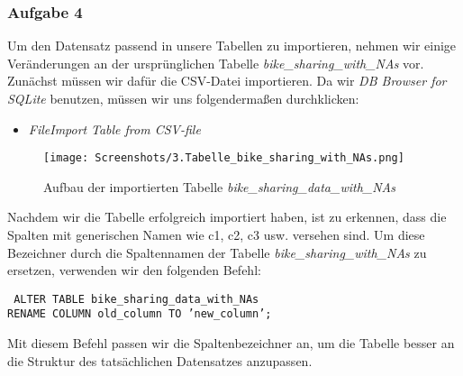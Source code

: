 \documentclass[a4paper, 12pt]{article}
\begin{document}
\newpage
\subsubsection{Aufgabe 4}
{\fontsize{12}{15}\selectfont
Um den Datensatz passend in unsere Tabellen zu importieren, nehmen wir einige Veränderungen an der ursprünglichen Tabelle \textit{bike\_sharing\_with\_NAs} vor. Zunächst müssen wir dafür die CSV-Datei importieren. Da wir \textit{DB Browser for SQLite} benutzen, müssen wir uns folgendermaßen durchklicken:

\vspace{\baselineskip} 

\begin{itemize}
    \item \textit{File}\rightarrow \textit{Import} \rightarrow \textit{Table from CSV-file}
\end{itemize} 

\vspace{\baselineskip} 

\begin{figure}[ht]
    \centering
      \texttt{[image: Screenshots/3.Tabelle\_bike\_sharing\_with\_NAs.png]}
        \par Aufbau der importierten Tabelle \textit{bike\_sharing\_data\_with\_NAs} 
\end{figure}


\vspace{\baselineskip} 

Nachdem wir die Tabelle erfolgreich importiert haben, ist zu erkennen, dass die Spalten mit generischen Namen wie c1, c2, c3 usw. versehen sind. Um diese Bezeichner durch die Spaltennamen der Tabelle \textit{bike\_sharing\_with\_NAs} zu ersetzen, verwenden wir den folgenden Befehl:

\vspace{\baselineskip}

{\fontsize{10}{12}\selectfont
\texttt{%
ALTER TABLE bike\_sharing\_data\_with\_NAs \\ RENAME COLUMN old\_column TO 'new\_column';} 
}

\vspace{\baselineskip}

Mit diesem Befehl passen wir die Spaltenbezeichner an, um die Tabelle besser an die Struktur des tatsächlichen Datensatzes anzupassen.}
\end{document}
